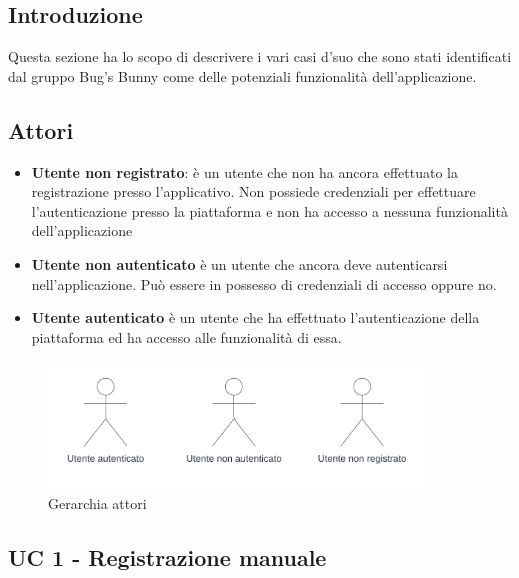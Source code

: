 \subsection{Introduzione}
Questa sezione ha lo scopo di descrivere i vari casi d'suo che sono stati identificati dal gruppo Bug's Bunny 
come delle potenziali funzionalità dell'applicazione.

\subsection{Attori}
\begin{itemize}
    \item \textbf{Utente non registrato}: 
    è un utente che non ha ancora effettuato la registrazione presso l'applicativo. 
    Non possiede credenziali per effettuare l'autenticazione presso la piattaforma e non ha accesso a nessuna funzionalità dell'applicazione  
    \item \textbf{Utente non autenticato}
    è un utente che ancora deve autenticarsi nell'applicazione. Può essere in possesso di credenziali di accesso oppure no.
    \item \textbf{Utente autenticato}
    è un utente che ha effettuato l'autenticazione della piattaforma ed ha accesso alle funzionalità di essa.
\end{itemize}

\begin{figure}[!h]
    \includegraphics[width=10cm]{sezioni/Images/Actors.png}
    \centering
    \caption{Gerarchia attori}
\end{figure}
\newpage
    
\subsection{UC 1 - Registrazione manuale}

